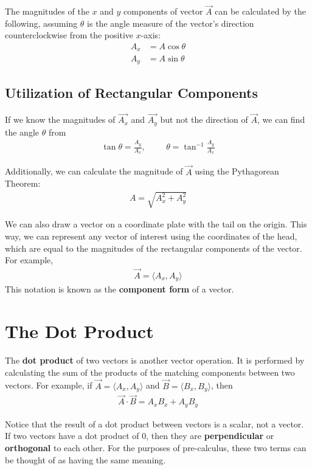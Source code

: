 \documentclass[11pt]{article}
\begin{document}
The magnitudes of the $x$ and $y$ components of vector \(\Vec{A}\) can be calculated by the following, assuming $\theta$ is the angle measure of the vector's direction counterclockwise from the positive $x$-axis:
\begin{align*}
    A_{x} &= A\cos{\theta} \\
    A_{y} &= A\sin{\theta} 
\end{align*}

\subsection{Utilization of Rectangular Components}

If we know the magnitudes of $\Vec{A_{x}}$ and $\Vec{A_{y}}$ but not the direction of \(\Vec{A}\), we can find the angle $\theta$ from
\begin{align*}
    \tan{\theta} = \frac{A_y}{A_x},\hspace{1cm}\theta = \tan^{-1}\frac{A_y}{A_x}    
\end{align*}

Additionally, we can calculate the magnitude of $\Vec{A}$ using the Pythagorean Theorem:
\begin{align*}
    A = \sqrt{A_{x}^{2} + A_{y}^{2}}
\end{align*}

We can also draw a vector on a coordinate plate with the tail on the origin. This way, we can represent any vector of interest using the coordinates of the head, which are equal to the magnitudes of the rectangular components of the vector. For example, 
\begin{align*}
    \Vec{A} = \langle A_x, A_y\rangle 
\end{align*}
This notation is known as the \textbf{component form} of a vector.

\section{The Dot Product}

The \textbf{dot product} of two vectors is another vector operation. It is performed by calculating the sum of the products of the matching components between two vectors. For example, if $\Vec{A} = \langle A_x, A_y\rangle$ and $\Vec{B} = \langle B_x, B_y\rangle$, then 
\begin{align*}
    \Vec{A} \cdot \Vec{B} = A_xB_x + A_yB_y 
\end{align*}

Notice that the result of a dot product between vectors is a scalar, not a vector. If two vectors have a dot product of $0$, then they are \textbf{perpendicular} or \textbf{orthogonal} to each other. For the purposes of pre-calculus, these two terms can be thought of as having the same meaning. 
\end{document}
